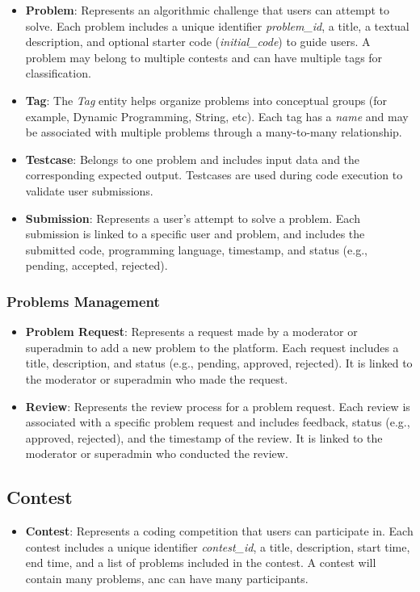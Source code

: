 \begin{itemize}
    \item \textbf{Problem}: Represents an algorithmic challenge that users can attempt to solve. Each problem includes a unique identifier \textit{problem\_id}, a title, a textual description, and optional starter code (\textit{initial\_code}) to guide users.
A problem may belong to multiple contests and can have multiple tags for classification.
    \item \textbf{Tag}: The \textit{Tag} entity helps organize problems into conceptual groups (for example, Dynamic Programming, String, etc). Each tag has a \textit{name} and may be associated with multiple problems through a many-to-many relationship.
    \item \textbf{Testcase}: Belongs to one problem and includes input data and the corresponding expected output. Testcases are used during code execution to validate user submissions.
    \item \textbf{Submission}: Represents a user's attempt to solve a problem. Each submission is linked to a specific user and problem, and includes the submitted code, programming language, timestamp, and status (e.g., pending, accepted, rejected).
\end{itemize}

\subsubsection*{Problems Management}

\begin{itemize}
    \item \textbf{Problem Request}: Represents a request made by a moderator or superadmin to add a new problem to the platform. Each request includes a title, description, and status (e.g., pending, approved, rejected). It is linked to the moderator or superadmin who made the request.
    \item \textbf{Review}: Represents the review process for a problem request. Each review is associated with a specific problem request and includes feedback, status (e.g., approved, rejected), and the timestamp of the review. It is linked to the moderator or superadmin who conducted the review.
\end{itemize}

\subsection*{Contest}
\begin{itemize}
    \item \textbf{Contest}: Represents a coding competition that users can participate in. Each contest includes a unique identifier \textit{contest\_id}, a title, description, start time, end time, and a list of problems included in the contest. A contest will contain many problems, anc can have many participants.
\end{itemize}

